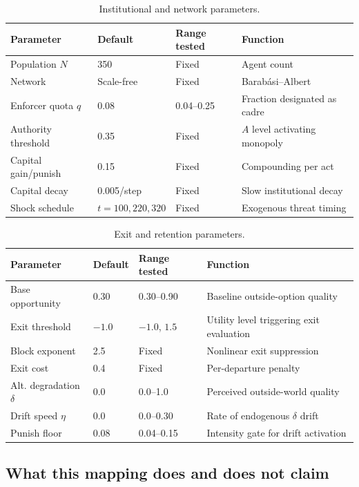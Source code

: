 \documentclass[12pt]{article}
\begin{document}
\begin{table}[ht]
\centering
\caption{Institutional and network parameters.}
\label{tab:inst-params}
\begin{tabular}{llll}
\toprule
Parameter & Default & Range tested & Function \\
\midrule
Population $N$ & 350 & Fixed & Agent count \\
Network & Scale-free & Fixed & Barab\'asi--Albert \\
Enforcer quota $q$ & 0.08 & 0.04--0.25 & Fraction designated as cadre \\
Authority threshold & 0.35 & Fixed & $A$ level activating monopoly \\
Capital gain/punish & 0.15 & Fixed & Compounding per act \\
Capital decay & 0.005/step & Fixed & Slow institutional decay \\
Shock schedule & $t = 100, 220, 320$ & Fixed & Exogenous threat timing \\
\bottomrule
\end{tabular}
\end{table}

\begin{table}[ht]
\centering
\caption{Exit and retention parameters.}
\label{tab:exit-params}
\begin{tabular}{llll}
\toprule
Parameter & Default & Range tested & Function \\
\midrule
Base opportunity & 0.30 & 0.30--0.90 & Baseline outside-option quality \\
Exit threshold & $-1.0$ & $-1.0$, $1.5$ & Utility level triggering exit evaluation \\
Block exponent & 2.5 & Fixed & Nonlinear exit suppression \\
Exit cost & 0.4 & Fixed & Per-departure penalty \\
Alt. degradation $\delta$ & 0.0 & 0.0--1.0 & Perceived outside-world quality \\
Drift speed $\eta$ & 0.0 & 0.0--0.30 & Rate of endogenous $\delta$ drift \\
Punish floor & 0.08 & 0.04--0.15 & Intensity gate for drift activation \\
\bottomrule
\end{tabular}
\end{table}

\subsection{What this mapping does and does not claim}
\end{document}
